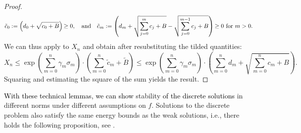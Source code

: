 \documentclass{m2an}
\newcommand\blue[1]{\textcolor{black}{#1}}
\begin{document}
\begin{proof}
\begin{equation*}
    \tilde c_0 := \left(d_0 + \sqrt{c_0 + B}\right) \blue{\ge 0}, \quad \text{and} \quad
    \tilde c_m := \left(d_m + \sqrt{\sum_{j=0}^m c_j + B} 
    - \sqrt{\sum_{j=0}^{m-1} c_j + B}\right) \blue{\ge 0} \text{ for } m>0.
  \end{equation*}
  We can thus apply  to $X_n$
  and obtain after resubstituting the tilded quantities:
  \begin{equation*}
    X_n \le \exp\left(\sum_{m=0}^n \gamma_m \sigma_m\right) \cdot
    \left( \sum_{m=0}^n \tilde c_m + \tilde B \right)
    \le \exp\left(\sum_{m=0}^n \gamma_m \sigma_m\right) \cdot
    \left( \sum_{m=0}^n d_m + \sqrt{\sum_{m=0}^n c_m + B} \right).
  \end{equation*}
  Squaring and estimating the square of the sum yields the result.
\end{proof}
\blue{With these technical lemmas, we can show}
stability \blue{of the discrete solutions} in different norms under different assumptions on $f$.
Solutions to the discrete problem also satisfy the same energy bounds as the weak solutions,
i.e., there holds the following proposition, see \cite[Lemma 5.1, Theorem A.1]{Chrysafinos2010}.
\end{document}
